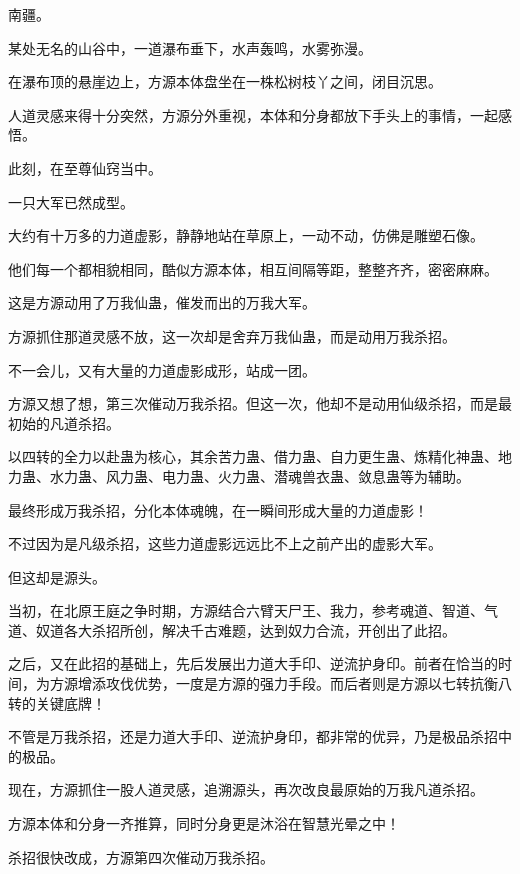 
\begin{this_body}



南疆。

某处无名的山谷中，一道瀑布垂下，水声轰鸣，水雾弥漫。

在瀑布顶的悬崖边上，方源本体盘坐在一株松树枝丫之间，闭目沉思。

人道灵感来得十分突然，方源分外重视，本体和分身都放下手头上的事情，一起感悟。

此刻，在至尊仙窍当中。

一只大军已然成型。

大约有十万多的力道虚影，静静地站在草原上，一动不动，仿佛是雕塑石像。

他们每一个都相貌相同，酷似方源本体，相互间隔等距，整整齐齐，密密麻麻。

这是方源动用了万我仙蛊，催发而出的万我大军。

方源抓住那道灵感不放，这一次却是舍弃万我仙蛊，而是动用万我杀招。

不一会儿，又有大量的力道虚影成形，站成一团。

方源又想了想，第三次催动万我杀招。但这一次，他却不是动用仙级杀招，而是最初始的凡道杀招。

以四转的全力以赴蛊为核心，其余苦力蛊、借力蛊、自力更生蛊、炼精化神蛊、地力蛊、水力蛊、风力蛊、电力蛊、火力蛊、潜魂兽衣蛊、敛息蛊等为辅助。

最终形成万我杀招，分化本体魂魄，在一瞬间形成大量的力道虚影！

不过因为是凡级杀招，这些力道虚影远远比不上之前产出的虚影大军。

但这却是源头。

当初，在北原王庭之争时期，方源结合六臂天尸王、我力，参考魂道、智道、气道、奴道各大杀招所创，解决千古难题，达到奴力合流，开创出了此招。

之后，又在此招的基础上，先后发展出力道大手印、逆流护身印。前者在恰当的时间，为方源增添攻伐优势，一度是方源的强力手段。而后者则是方源以七转抗衡八转的关键底牌！

不管是万我杀招，还是力道大手印、逆流护身印，都非常的优异，乃是极品杀招中的极品。

现在，方源抓住一股人道灵感，追溯源头，再次改良最原始的万我凡道杀招。

方源本体和分身一齐推算，同时分身更是沐浴在智慧光晕之中！

杀招很快改成，方源第四次催动万我杀招。


\end{this_body}
